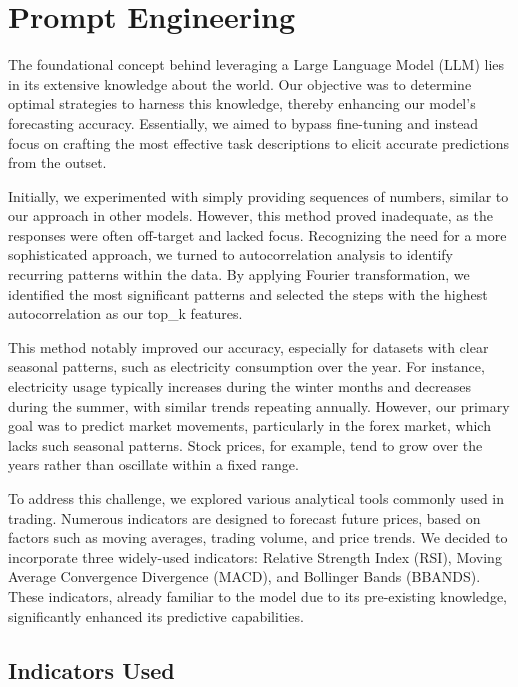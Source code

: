 \section{Prompt Engineering}

The foundational concept behind leveraging a Large Language Model (LLM) lies in its extensive knowledge about the world. Our objective was to determine optimal strategies to harness this knowledge, thereby enhancing our model's forecasting accuracy. Essentially, we aimed to bypass fine-tuning and instead focus on crafting the most effective task descriptions to elicit accurate predictions from the outset.

Initially, we experimented with simply providing sequences of numbers, similar to our approach in other models. However, this method proved inadequate, as the responses were often off-target and lacked focus. Recognizing the need for a more sophisticated approach, we turned to autocorrelation analysis to identify recurring patterns within the data. By applying Fourier transformation, we identified the most significant patterns and selected the steps with the highest autocorrelation as our top\_k features.

This method notably improved our accuracy, especially for datasets with clear seasonal patterns, such as electricity consumption over the year. For instance, electricity usage typically increases during the winter months and decreases during the summer, with similar trends repeating annually. However, our primary goal was to predict market movements, particularly in the forex market, which lacks such seasonal patterns. Stock prices, for example, tend to grow over the years rather than oscillate within a fixed range.

To address this challenge, we explored various analytical tools commonly used in trading. Numerous indicators are designed to forecast future prices, based on factors such as moving averages, trading volume, and price trends. We decided to incorporate three widely-used indicators: Relative Strength Index (RSI), Moving Average Convergence Divergence (MACD), and Bollinger Bands (BBANDS). These indicators, already familiar to the model due to its pre-existing knowledge, significantly enhanced its predictive capabilities.



\subsection{Indicators Used}

